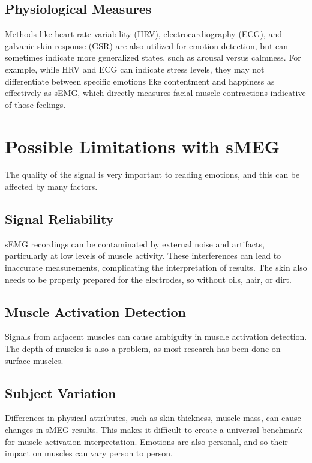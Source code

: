 \documentclass[twocolumn]{article}
\begin{document}
\subsection{Physiological Measures}
 Methods like heart rate variability (HRV), electrocardiography (ECG), and galvanic skin response (GSR) are also utilized for emotion detection, but can sometimes indicate more generalized states, such as arousal versus calmness. For example, while HRV and ECG can indicate stress levels, they may not differentiate between specific emotions like contentment and happiness as effectively as sEMG, which directly measures facial muscle contractions indicative of those feelings. 
 \cite{Mavratzakis_Herbert_Walla_2016}
 \cite{Pourmohammadi_Maleki_2020}
\section{Possible Limitations with sMEG}
The quality of the signal is very important to reading emotions, and this can be affected by many factors.
\subsection{Signal Reliability}
sEMG recordings can be contaminated by external noise and artifacts, particularly at low levels of muscle activity. These interferences can lead to inaccurate measurements, complicating the interpretation of results. \cite{Naik_Kumar_Arjunan_Palaniswami_Begg_2006} The skin also needs to be properly prepared for the electrodes, so without oils, hair, or dirt.\cite{Djuwari_Kumar_Arjunan_Naik_2008}
\subsection{Muscle Activation Detection}
Signals from adjacent muscles can cause ambiguity in muscle activation detection. 
The depth of muscles is also a problem, as most research has been done on surface muscles.\cite{Zheng_Wan_Xu_Wang_Qiao_2020}
\subsection{Subject Variation}
Differences in physical attributes, such as skin thickness, muscle mass, can cause changes in sMEG results. This makes it difficult to create a universal benchmark for muscle activation interpretation. \cite{Djuwari_Kumar_Arjunan_Naik_2008} Emotions are also personal, and so their impact on muscles can vary person to person.\cite{ceramic-on-metal_bearing_hip_replacement_of_Sciences_2023}

\end{document}

